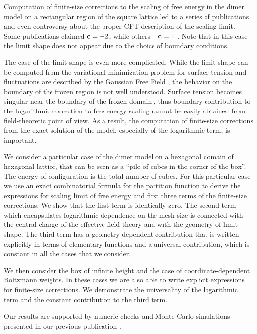 \documentclass{article}
\begin{document}
Computation of finite-size corrections to the scaling of free energy in the dimer model on a rectangular
region of the square lattice led to a series of publications and even controversy about the proper CFT
description of the scaling limit. Some publications claimed ${\bf c}=-2$, while others -- ${\bf c}=1$ 
\cite{allegra2015exact,morin2016integrability,Sh_Izmailian_2019,izmailian2016finite,izmailian2005logarithmic}. 
Note that in this case the limit shape does not appear due to the choice of boundary conditions. 

The case of the limit shape is even more complicated. While the limit shape can be computed from the
variational minimization problem for surface tension \cite{kenyon2007limit,kenyon2006dimers} and
fluctuations are described by the Gaussian Free Field
\cite{kenyon2001dominos,kenyon2008height,kenyon2009lectures}, the behavior on the boundary of the
frozen region is not well understood. Surface tension becomes singular near the boundary of the frozen
domain \cite{kenyon2007limit}, thus boundary contribution to the logarithmic correction to free
energy scaling cannot be easily obtained from field-theoretic point of view. As a result, the
computation of finite-size corrections from the exact solution of the model, especially of the
logarithmic term, is important.

We consider a particular case of the dimer model on a hexagonal domain
of hexagonal lattice, that can be seen as a ``pile of cubes in the
corner of the box''. The energy of configuration is the total number
of cubes. For this particular case we use an exact combinatorial
formula for the partition function to derive the expressions for
scaling limit of free energy and first three terms of the finite-size
corrections. We show that the first term is identically zero. The
second term which encapsulates logarithmic dependence on the mesh size
is connected with the central charge of the effective field theory and
with the geometry of limit shape. The third term has a
geometry-dependent contribution that is written explicitly in terms of
elementary functions and a universal contribution, which is constant
in all the cases that we consider.

We then consider the box of infinite height and the case of
coordinate-dependent Boltzmann weights. In these cases we are also
able to write explicit expressions for finite-size corrections. We
demonstrate the universality of the logarithmic term and the constant
contribution to the third term.

Our results are supported by numeric checks and Monte-Carlo
simulations presented in our previous publication
\cite{1742-6596-1135-1-012024}.
\end{document}
